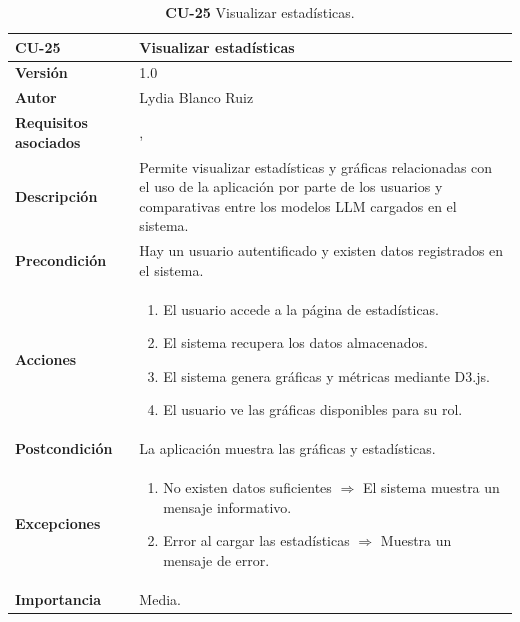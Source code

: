\begin{table}[p]
	\centering
	\begin{tabularx}{\linewidth}{ p{} p{} }
		\toprule
		\textbf{\textbf{CU-25}}    & \textbf{ Visualizar estadísticas}\\
		\toprule
		\textbf{Versión}              & 1.0    \\
		\textbf{Autor}                & Lydia Blanco Ruiz \\
		\textbf{Requisitos asociados} & \refreq{RF-13}, {RNF-6}\\
		\textbf{Descripción}          & Permite visualizar estadísticas y gráficas relacionadas con el uso de la aplicación por parte de los usuarios y comparativas entre los modelos LLM cargados en el sistema. \\
		\textbf{Precondición}         & Hay un usuario autentificado y existen datos registrados en el sistema. \\
		\textbf{Acciones}             &
		\begin{enumerate}
			\def\labelenumi{\arabic{enumi}.}
			\tightlist
			\item El usuario accede a la página de estadísticas.
			\item El sistema recupera los datos almacenados.
			\item El sistema genera gráficas y métricas mediante D3.js.
			\item El usuario ve las gráficas disponibles para su rol.
		\end{enumerate}\\
		\textbf{Postcondición}        & La aplicación muestra las gráficas y estadísticas. \\
		\textbf{Excepciones}          & 
		\begin{enumerate}
			\def\labelenumi{\arabic{enumi}.}
			\tightlist
			\item No existen datos suficientes $\Rightarrow$ El sistema muestra un mensaje informativo.
			\item Error al cargar las estadísticas $\Rightarrow$ Muestra un mensaje de error.
		\end{enumerate}\\
		\textbf{Importancia}          & Media.  \\
		\bottomrule
	\end{tabularx}
	\caption{\textbf{CU-25} Visualizar estadísticas.}
	\label{req-25}
\end{table}

